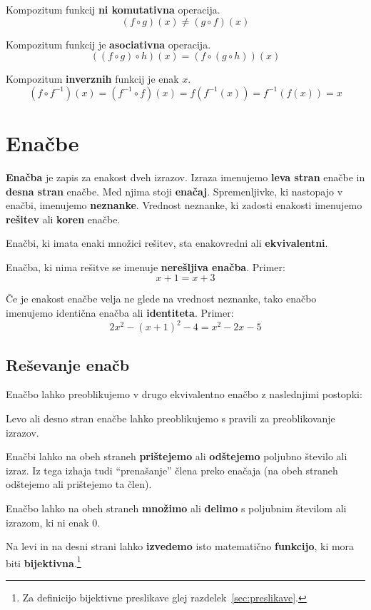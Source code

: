 \documentclass[a4paper,oneside,12pt,fleqn]{article}
\numberwithin{equation}{section}
\newenvironment{itemize*}%
{
\vspace{-12pt}%
\begin{itemize}%
\setlength{\itemsep}{0pt}%
\setlength{\parskip}{2pt}}%
{\end{itemize}}
\begin{document}
Kompozitum funkcij \textbf{ni komutativna} operacija.
\[ (f \circ g)(x) \neq (g \circ f)(x) \]

Kompozitum funkcij je \textbf{asociativna} operacija.
\[ ( (f \circ g) \circ h)(x) = (f \circ (g \circ h))(x) \]

Kompozitum \textbf{inverznih} funkcij je enak $x$.
\[ (f \circ f^{-1})(x) = (f^{-1} \circ f)(x) = f(f^{-1}(x)) = f^{-1}(f(x)) = x \]


\section{Enačbe}
\label{sec:enac}
\textbf{Enačba} je zapis za enakost dveh izrazov. Izraza imenujemo \textbf{leva stran}
enačbe in \textbf{desna stran}
enačbe. Med njima stoji \textbf{enačaj}. Spremenljivke, ki nastopajo v enačbi, imenujemo
\textbf{neznanke}.
Vrednost neznanke, ki zadosti enakosti imenujemo \textbf{rešitev} ali \textbf{koren} enačbe.

Enačbi, ki imata enaki množici rešitev, sta enakovredni ali \textbf{ekvivalentni}.

Enačba, ki nima rešitve se imenuje \textbf{nerešljiva enačba}. Primer:
\[ x + 1 = x + 3 \]

Če je enakost enačbe velja ne glede na vrednost neznanke, tako enačbo imenujemo identična
enačba ali \textbf{identiteta}. Primer:
\[2x^2 -(x + 1)^2 - 4 = x^2 - 2x - 5 \]

\subsection{Reševanje enačb}
\label{sec:enac:resev}
Enačbo lahko preoblikujemo v drugo ekvivalentno enačbo z naslednjimi postopki:
\begin{itemize*}
  \item Levo ali desno stran enačbe lahko preoblikujemo s pravili za preoblikovanje
    izrazov.
  \item Enačbi lahko na obeh straneh \textbf{prištejemo} ali \textbf{odštejemo} poljubno število
ali izraz. Iz tega izhaja tudi ``prenašanje'' člena preko enačaja (na obeh straneh odštejemo ali
prištejemo ta člen).

  \item Enačbo lahko na obeh straneh \textbf{množimo} ali \textbf{delimo} s poljubnim številom ali izrazom, ki ni
enak 0. 

  \item Na levi in na desni strani lahko \textbf{izvedemo} isto matematično \textbf{funkcijo}, ki mora biti
\textbf{bijektivna}.\footnote{Za definicijo bijektivne preslikave glej
razdelek~\ref{sec:preslikave}.}
\end{itemize*}
\end{document}
